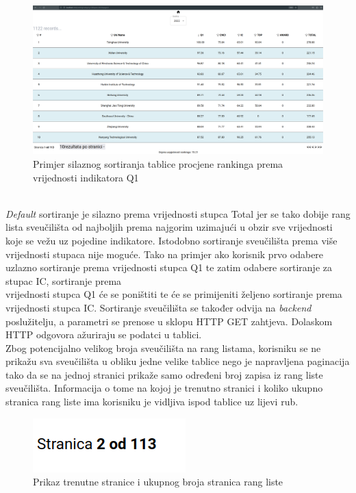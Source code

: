 \documentclass[times, utf8, zavrsni]{fer}
\begin{document}
\begin{figure}[htb]
    \hspace*{-2cm}  
       \includegraphics[scale=0.21]{sort2.png} 
       \caption{Primjer silaznog sortiranja tablice procjene rankinga prema vrijednosti indikatora Q1}
       \label{fig:sort2}
       \end{figure}
\\\emph{Default} sortiranje je silazno prema vrijednosti stupca Total jer se tako dobije rang lista sveučilišta od najboljih prema najgorim uzimajući u obzir sve 
vrijednosti koje se vežu uz pojedine indikatore.
Istodobno sortiranje sveučilišta prema više vrijednosti stupaca nije moguće. Tako na primjer ako korisnik prvo odabere uzlazno sortiranje prema vrijednosti stupca 
Q1 te zatim odabere sortiranje za stupac IC, sortiranje prema \\vrijednosti stupca Q1 će se poništiti te će se primijeniti željeno sortiranje prema vrijednosti stupca IC.
Sortiranje sveučilišta se također odvija na 
\emph{backend} poslužitelju, a parametri se prenose u sklopu HTTP GET zahtjeva. Dolaskom HTTP odgovora ažuriraju se podatci u tablici.
\\Zbog potencijalno velikog broja sveučilišta na rang listama, korisniku se ne prikažu sva sveučilišta u obliku jedne velike tablice nego 
je napravljena paginacija tako da se na jednoj stranici prikaže samo određeni broj zapisa iz rang liste sveučilišta. Informacija o tome na kojoj je trenutno stranici i 
koliko ukupno stranica rang liste ima korisniku je vidljiva ispod tablice uz lijevi rub. 
\begin{figure}[htb]
    \centering
       \includegraphics[scale=0.3]{stranica.png} 
       \caption{Prikaz trenutne stranice i ukupnog broja stranica rang liste}
       \label{fig:paginacija}
       \end{figure}
\end{document}

